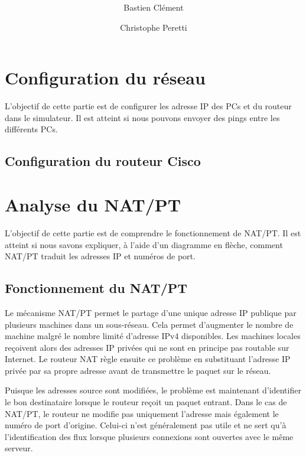 \documentclass[11pt,a4paper]{article}
\author{Bastien Clément \and Christophe Peretti}
\title{{\normalsize \doccourse} \\ \doctitle }
\begin{document}
\maketitle
\vspace{1em}

\section{Configuration du réseau}

L'objectif de cette partie est de configurer les adresse IP des PCs et du routeur dans le simulateur. Il est atteint si nous pouvons envoyer des pings entre les différents PCs.

\subsection{Configuration du routeur Cisco}


\section{Analyse du NAT/PT}

L'objectif de cette partie est de comprendre le fonctionnement de NAT/PT. Il est atteint si nous savons expliquer, à l'aide d'un diagramme en flèche, comment NAT/PT traduit les adresses IP et numéros de port.

\subsection{Fonctionnement du NAT/PT}

Le mécanisme NAT/PT permet le partage d'une unique adresse IP publique par plusieurs machines dans un sous-réseau. Cela permet d'augmenter le nombre de machine malgré le nombre limité d'adresse IPv4 disponibles.
Les machines locales reçoivent alors des adresses IP privées qui ne sont en principe pas routable sur Internet. Le routeur NAT règle ensuite ce problème en substituant l'adresse IP privée par sa propre adresse avant de transmettre le paquet sur le réseau. 

Puisque les adresses source sont modifiées, le problème est maintenant d'identifier le bon destinataire lorsque le routeur reçoit un paquet entrant.
Dans le cas de NAT/PT, le routeur ne modifie pas uniquement l'adresse mais également le numéro de port d'origine. Celui-ci n'est généralement pas utile et ne sert qu'à l'identification des flux lorsque plusieurs connexions sont ouvertes avec le même serveur.
\end{document}
